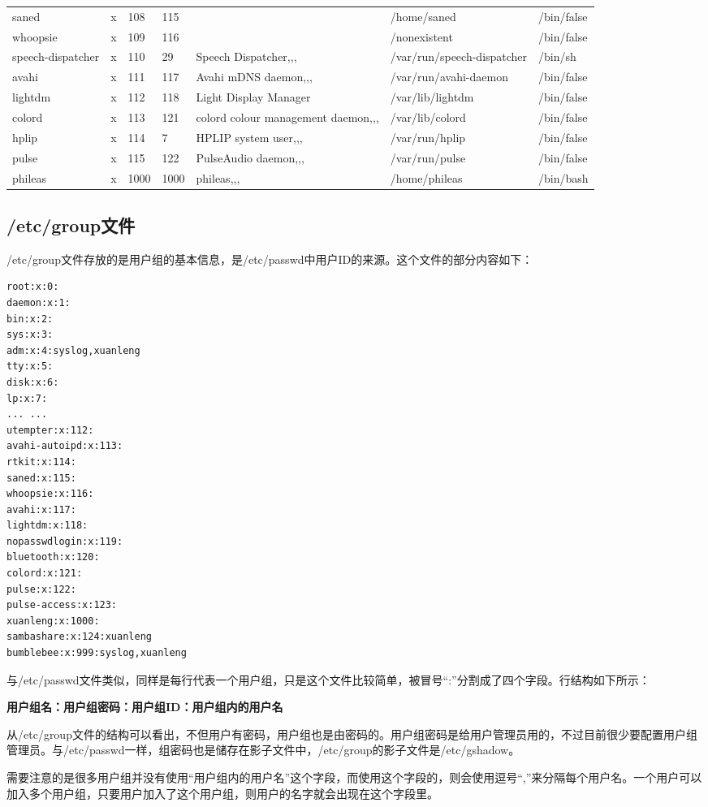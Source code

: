 {{\begin{tabular}{l|l|l|l|l|l|l}
saned&x&108&115&&/home/saned&/bin/false\\
whoopsie&x&109&116&&/nonexistent&/bin/false\\
speech-dispatcher&x&110&29&Speech Dispatcher,,,&/var/run/speech-dispatcher&/bin/sh\\
avahi&x&111&117&Avahi mDNS daemon,,,&/var/run/avahi-daemon&/bin/false\\
lightdm&x&112&118&Light Display Manager&/var/lib/lightdm&/bin/false\\
colord&x&113&121&colord colour management daemon,,,&/var/lib/colord&/bin/false\\
hplip&x&114&7&HPLIP system user,,,&/var/run/hplip&/bin/false\\
pulse&x&115&122&PulseAudio daemon,,,&/var/run/pulse&/bin/false\\
phileas&x&1000&1000&phileas,,,&/home/phileas&/bin/bash\\
\end{tabular}
}


\subsection{/etc/group文件}
/etc/group文件存放的是用户组的基本信息，是/etc/passwd中用户ID的来源。这个文件的部分内容如下：
\begin{verbatim}
root:x:0:
daemon:x:1:
bin:x:2:
sys:x:3:
adm:x:4:syslog,xuanleng
tty:x:5:
disk:x:6:
lp:x:7:
... ...
utempter:x:112:
avahi-autoipd:x:113:
rtkit:x:114:
saned:x:115:
whoopsie:x:116:
avahi:x:117:
lightdm:x:118:
nopasswdlogin:x:119:
bluetooth:x:120:
colord:x:121:
pulse:x:122:
pulse-access:x:123:
xuanleng:x:1000:
sambashare:x:124:xuanleng
bumblebee:x:999:syslog,xuanleng
\end{verbatim}

与/etc/passwd文件类似，同样是每行代表一个用户组，只是这个文件比较简单，被冒号“:”分割成了四个字段。行结构如下所示：

\centerline{\textbf{用户组名：用户组密码：用户组ID：用户组内的用户名}}

从/etc/group文件的结构可以看出，不但用户有密码，用户组也是由密码的。用户组密码是给用户管理员用的，不过目前很少要配置用户组管理员。与/etc/passwd一样，组密码也是储存在影子文件中，/etc/group的影子文件是/etc/gshadow。

需要注意的是很多用户组并没有使用“用户组内的用户名”这个字段，而使用这个字段的，则会使用逗号“,”来分隔每个用户名。一个用户可以加入多个用户组，只要用户加入了这个用户组，则用户的名字就会出现在这个字段里。


}
